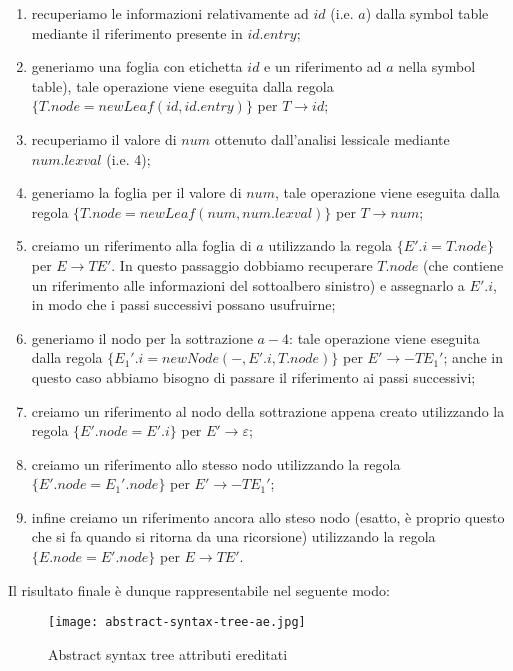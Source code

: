 \documentclass[class=book, crop=false, oneside, 12pt]{standalone}
\begin{document}
\begin{enumerate}
    \item recuperiamo le informazioni relativamente ad \(id\) (i.e. \(a\)) dalla symbol table mediante il riferimento presente in \(id.entry\);
    \item generiamo una foglia con etichetta \(id\) e un riferimento ad \(a\) nella symbol table), tale operazione viene eseguita dalla regola \(\{T.node = newLeaf(id, id.entry)\}\) per  \(T \to id\);
    \item recuperiamo il valore di \(num\) ottenuto dall'analisi lessicale mediante \(num.lexval\) (i.e. 4);
    \item generiamo la foglia per il valore di \(num\), tale operazione viene eseguita dalla regola \(\{T.node = newLeaf(num, num.lexval)\}\) per \(T \to num\);
    \item creiamo un riferimento alla foglia di \(a\) utilizzando la regola \(\{E'.i = T.node\}\) per  \(E \to TE'\). In questo passaggio dobbiamo recuperare \(T.node\) (che contiene un riferimento alle informazioni del sottoalbero sinistro) e assegnarlo a \(E'.i\), in modo che i passi successivi possano usufruirne;
    \item generiamo il nodo per la sottrazione \(a-4\): tale operazione viene eseguita dalla regola \(\{E_{1}'.i = newNode(-, E'.i, T.node)\}\) per \(E' \to -TE_{1}'\); anche in questo caso abbiamo bisogno di passare il riferimento ai passi successivi;
    \item creiamo un riferimento al nodo della sottrazione appena creato utilizzando la regola \(\{E'.node = E'.i\}\) per \(E' \to \varepsilon\);
    \item creiamo un riferimento allo stesso nodo utilizzando la regola \(\{E'.node = E_{1}'.node\}\) per \(E' \to -TE_{1}'\);
    \item infine creiamo un riferimento ancora allo steso nodo (esatto, è proprio questo che si fa quando si ritorna da una ricorsione) utilizzando la regola \(\{E.node = E'.node\}\) per \(E \to TE'\).
\end{enumerate}

Il risultato finale è dunque rappresentabile nel seguente modo:

\begin{figure}[H]
	\centering
    \texttt{[image: abstract-syntax-tree-ae.jpg]}
    \caption{Abstract syntax tree attributi ereditati}
    \label{fig:abstract-syntax-tree-ae}
\end{figure}
\end{document}
